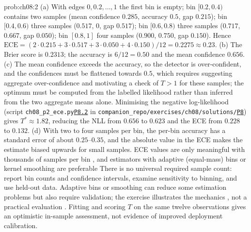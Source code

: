 \documentclass[graybox,envcountchap]{style/SNmono}
\newcommand{\repopath}[1]{\texttt{#1}}
\providecommand{\DIFadd}[1]{{\protect\color{blue} #1}} %
\providecommand{\DIFdel}[1]{{\protect\color{red} #1}} %
\providecommand{\DIFaddbegin}{} %
\providecommand{\DIFaddend}{} %
\providecommand{\DIFdelbegin}{} %
\providecommand{\DIFdelend}{} %
\DeclareRobustCommand{\RtwoDel}[1]{{\color{red}%
  \renewcommand{\DIFadd}[1]{##1}\renewcommand{\DIFdel}[1]{##1}%
  #1}}
\DeclareRobustCommand{\RtwoAdd}[1]{{\color{blue}#1}}
\DeclareRobustCommand{\codeentry}[1]{\hyperref[code:#1]{\texttt{#1}}}
\begin{document}
\begin{sol}{prob:ch08:2}
(a) With edges $0,0.2,\dots,1$ the first bin is empty; bin $[0.2,0.4)$ contains two samples (mean confidence $0.285$, accuracy $0.5$, gap $0.215$); bin $[0.4,0.6)$ three samples ($0.517$, $0$, gap $0.517$); bin $[0.6,0.8)$ three samples ($0.717$, $0.667$, gap $0.050$); bin $[0.8,1]$ four samples ($0.900$, $0.750$, gap $0.150$). Hence $\mathrm{ECE}=(2\cdot0.215+3\cdot0.517+3\cdot0.050+4\cdot0.150)/12=0.2275\approx0.23$. (b) The Brier score is $0.2313$; the accuracy is $6/12=0.50$ and the mean confidence $0.656$. (c) The mean confidence exceeds the accuracy, \DIFdelbegin \DIFdel{so the detector is over-confident, and the confidences must be flattened towards $0.5$, which requires }\DIFdelend \DIFaddbegin \DIFadd{suggesting aggregate over-confidence and motivating a check of }\DIFaddend $T>1$ \DIFaddbegin \DIFadd{for these samples; the optimum must be computed from the labelled likelihood rather than inferred from the two aggregate means alone}\DIFaddend . Minimising the negative log-likelihood (script \RtwoDel{\repopath{ch08\_\allowbreak p2\_\allowbreak ece.py}}\RtwoAdd{\codeentry{P8.2}} in \RtwoDel{\repopath{companion\_\allowbreak repo/\allowbreak exercises/\allowbreak ch08/\allowbreak solutions/\allowbreak }}\RtwoAdd{\codeentry{P8}}) gives $T^\ast\approx1.82$, reducing the NLL from $0.656$ to $0.623$ and the ECE from $0.228$ to $0.132$. (d) With two to four samples per bin, the per-bin accuracy has a standard error of about $0.25$--$0.35$, and the absolute value in the ECE makes the estimate biased upwards for small samples. \DIFdelbegin \DIFdel{ECE values are only meaningful with thousands of samples per bin , and estimators with adaptive (equal-mass) bins or kernel smoothing are preferable}\DIFdelend \DIFaddbegin \DIFadd{There is no universal required sample count: report bin counts and confidence intervals, examine sensitivity to binning, and use held-out data. Adaptive bins or smoothing can reduce some estimation problems but also require validation}\DIFaddend ; the exercise illustrates the mechanics\DIFdelbegin \DIFdel{, not a practical evaluation}\DIFdelend \DIFaddbegin \DIFadd{. Fitting and scoring $T$ on the same twelve observations gives an optimistic in-sample assessment, not evidence of improved deployment calibration}\DIFaddend .
\end{sol}
\end{document}
